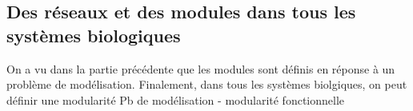  
%
%
%
%

\subsection{Des réseaux et des modules dans tous les systèmes biologiques}

On a vu dans la partie précédente que les modules sont définis en réponse à un problème de modélisation. Finalement, dans tous les systèmes biolgiques, on peut définir une modularité 
Pb de modélisation - modularité fonctionnelle

%




